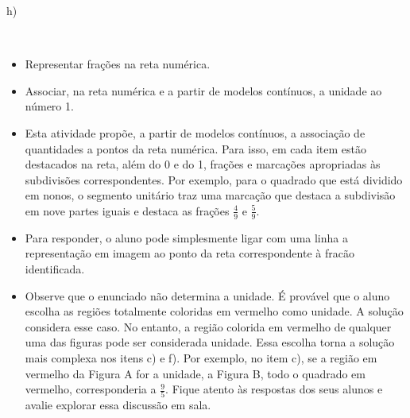 \begin{solucao}{}{}
h)

\end{solucao}

\clearpage
\mbox{ }
\vfill

\begin{objetivos}[label=chap3-ativ2]{}{}
\begin{itemize} %
    \item Representar frações na reta numérica.
    \item Associar, na reta numérica e a partir de modelos contínuos, a unidade ao número 1.
\end{itemize} %
\end{objetivos}

\begin{orientacoes}{}{}
\begin{itemize} %
    \item       Esta atividade propõe, a partir de modelos contínuos, a associação de quantidades a pontos da reta numérica. Para isso, em cada item estão destacados na reta, além do 0 e do 1, frações e marcações apropriadas às subdivisões correspondentes. Por exemplo, para o quadrado que  está dividido em nonos, o segmento unitário traz uma marcação que destaca a subdivisão em nove partes iguais e destaca as frações $\frac{4}{9}$ e $\frac{5}{9}$.
    \item Para responder, o aluno pode simplesmente ligar com uma linha a representação em imagem ao ponto da reta correspondente à fracão identificada.
    \item Observe que o enunciado não determina a unidade. É provável que o aluno escolha as regiões totalmente coloridas em vermelho como unidade. A solução considera esse caso. No entanto, a região colorida em vermelho de qualquer uma das figuras pode ser considerada unidade. Essa escolha torna a solução mais complexa nos itens c) e f). Por exemplo, no item c), se a região em vermelho da Figura A for a unidade, a Figura B, todo o quadrado em vermelho, corresponderia a $\frac{9}{5}$. Fique atento às respostas dos seus alunos e avalie explorar essa discussão em sala.
\end{itemize} %

\end{orientacoes}


